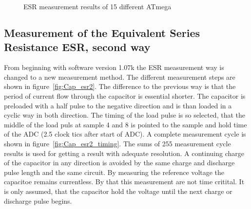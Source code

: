 \begin{figure}[H]
\centering

\caption{ESR measurement results of 15 different ATmega}
\label{fig:Cesr}
\end{figure}


\subsection{Measurement of the Equivalent Series Resistance ESR, second way}
From beginning with software version 1.07k the ESR measurement way is changed to a new measurement method.
The different measurement steps are shown in figure~\ref{fig:Cap_esr2}. The difference to the previous way is that
the period of current flow through the capacitor is essential shorter.
The capacitor is preloaded with a half pulse to the negative direction and is than loaded in a cyclic way in both
direction.
The timing of the load pulse is so selected, that the middle of the load puls at sample 4 and 8 is
pointed to the sample and hold time of the ADC (2.5 clock tics after start of ADC). 
A complete measurement cycle is shown in figure~\ref{fig:Cap_esr2_timing}.
The sums of 255 measurement cycle results is used for getting a result with adequate resolution. 
A continuing charge of the capacitor in any direction is avoided by the same charge and discharge pulse length
and the same circuit.
By measuring the reference voltage the capacitoe remains currentless. By that this measurement are not time critital.
It is only assumed, that the capacitor hold the voltage until the next charge or discharge pulse begins.

